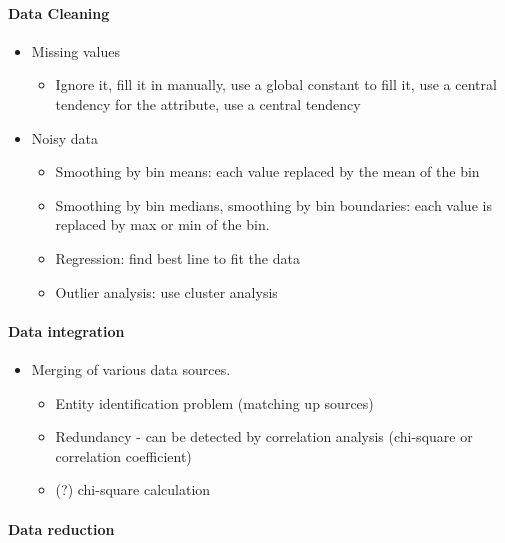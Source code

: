 \documentclass[11pt]{article}
\providecommand{\tightlist}{%
      \setlength{\itemsep}{0pt}\setlength{\parskip}{0pt}}
\begin{document}
    \paragraph{Data Cleaning}\label{data-cleaning}

    \begin{itemize}
\tightlist
\item
  Missing values

  \begin{itemize}
  \tightlist
  \item
    Ignore it, fill it in manually, use a global constant to fill it,
    use a central tendency for the attribute, use a central tendency
  \end{itemize}
\item
  Noisy data

  \begin{itemize}
  \tightlist
  \item
    Smoothing by bin means: each value replaced by the mean of the bin
  \item
    Smoothing by bin medians, smoothing by bin boundaries: each value is
    replaced by max or min of the bin.
  \item
    Regression: find best line to fit the data
  \item
    Outlier analysis: use cluster analysis
  \end{itemize}
\end{itemize}

    \paragraph{Data integration}\label{data-integration}

    \begin{itemize}
\tightlist
\item
  Merging of various data sources.

  \begin{itemize}
  \tightlist
  \item
    Entity identification problem (matching up sources)
  \item
    Redundancy - can be detected by correlation analysis (chi-square or
    correlation coefficient)
  \item
    (?) chi-square calculation
  \end{itemize}
\end{itemize}

    \paragraph{Data reduction}\label{data-reduction}
\end{document}
